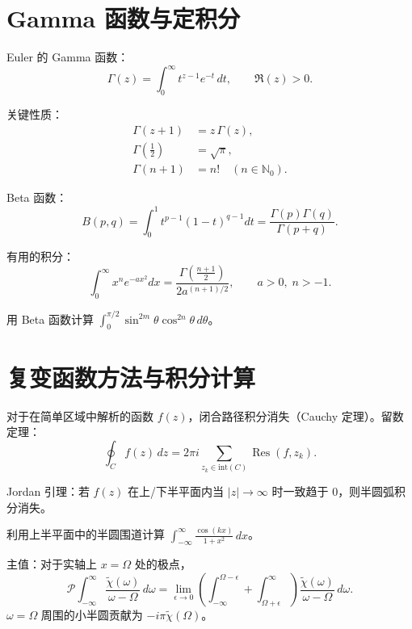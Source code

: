 \section{Gamma 函数与定积分}

Euler 的 Gamma 函数：
\begin{equation}
\Gamma(z) = \int_0^\infty t^{z-1}e^{-t}\,dt, \qquad \Re(z)>0.
\label{eq:6.3.1}
\end{equation}

关键性质：
\begin{align}
\Gamma(z+1) &= z\,\Gamma(z),\\
\Gamma(\tfrac12) &= \sqrt{\pi},\\
\Gamma(n+1) &= n! \quad (n\in\mathbb N_0).
\label{eq:6.3.2}
\end{align}

Beta 函数：
\begin{equation}
B(p,q) = \int_0^1 t^{p-1}(1-t)^{q-1}dt
= \frac{\Gamma(p)\Gamma(q)}{\Gamma(p+q)}.
\label{eq:6.3.3}
\end{equation}

有用的积分：
\begin{equation}
\int_0^\infty x^{n}e^{-ax^2}dx =
\frac{\Gamma\!\left(\frac{n+1}{2}\right)}{2a^{(n+1)/2}},
\qquad a>0,\;n>-1.
\label{eq:6.3.4}
\end{equation}

\begin{exercise}
用 Beta 函数计算 $\int_0^{\pi/2}\sin^{2m}\theta\cos^{2n}\theta\,d\theta$。
\end{exercise}

\section{复变函数方法与积分计算}

对于在简单区域中解析的函数 $f(z)$，闭合路径积分消失（Cauchy 定理）。留数定理：
\begin{equation}
\oint_C f(z)\,dz = 2\pi i\sum_{z_k\in\text{int}(C)} \operatorname{Res}(f,z_k).
\label{eq:6.4.1}
\end{equation}

Jordan 引理：若 $f(z)$ 在上/下半平面内当 $|z|\to\infty$ 时一致趋于 $0$，则半圆弧积分消失。

\begin{exercise}
利用上半平面中的半圆围道计算 $\int_{-\infty}^{\infty}\frac{\cos(kx)}{1+x^2}\,dx$。
\end{exercise}

主值：对于实轴上 $x=\Omega$ 处的极点，
\begin{equation}
\mathcal P\int_{-\infty}^{\infty}\frac{\tilde\chi(\omega)}{\omega-\Omega}\,d\omega
= \lim_{\epsilon\to0}\left(
\int_{-\infty}^{\Omega-\epsilon}+\int_{\Omega+\epsilon}^{\infty}
\right)\frac{\tilde\chi(\omega)}{\omega-\Omega}\,d\omega.
\label{eq:6.4.2}
\end{equation}
$\omega=\Omega$ 周围的小半圆贡献为 $-i\pi\tilde\chi(\Omega)$。

